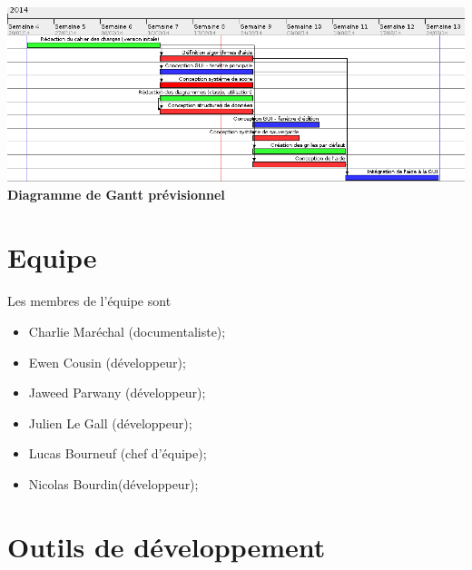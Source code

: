         \begin{center}
                \includegraphics[scale=.6, angle=90]{data/ganttDiagram.png}\\
                \textbf{Diagramme de Gantt prévisionnel}
        \end{center}


\section {Equipe}
        \paragraph*{}
        Les membres de l'équipe sont 
        \begin{itemize}
                \item Charlie Maréchal (documentaliste);
                \item Ewen Cousin (développeur);
                \item Jaweed Parwany (développeur);
                \item Julien Le Gall (développeur);
                \item Lucas Bourneuf (chef d'équipe);
                \item Nicolas Bourdin(développeur);
        \end{itemize}


\section{Outils de développement}
